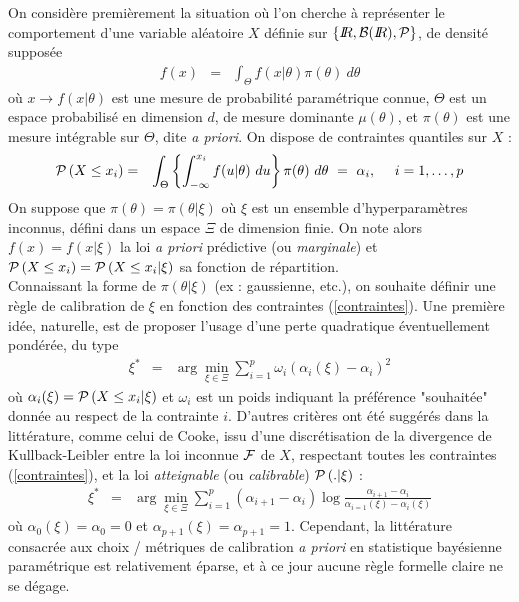 \documentclass[10pt]{article}
\newcommand{\R}{I\!\!R}
\newcommand{\1}{\mathbbm{1}}
\begin{document}
On consid\`ere premi\`erement la situation o\`u l'on cherche \`a repr\'esenter le comportement d'une variable al\'eatoire $X$ d\'efinie sur $\{\R,{\cal{B}}(\R),\cal{P}\}$, de densit\'e suppos\'ee
\begin{eqnarray}
f(x) & = & \int_{\Theta} f(x|\theta) \pi(\theta) \ d\theta
\end{eqnarray}
o\`u $x\to f(x|\theta)$ est une mesure de probabilit\'e param\'etrique connue, $\Theta$ est un espace probabilis\'e en dimension $d$, de mesure dominante $\mu(\theta)$, et $\pi(\theta)$ est une mesure int\'egrable sur $\Theta$, dite {\it a priori}. On dispose de contraintes quantiles sur $X$ : 
\begin{eqnarray}
{\cal{P}}\left(X\leq x_i \right) & = & \int_{\Theta} \left\{\int_{-\infty}^{x_i} f(u|\theta) \ du \right\} \pi(\theta) \ d\theta \ = \ \alpha_i, \ \ \ \ i=1,\ldots,p \label{contraintes}
\end{eqnarray}
On suppose que $\pi(\theta)=\pi(\theta|\xi)$ o\`u $\xi$ est un ensemble d'hyperparam\`etres inconnus, d\'efini dans un espace $\Xi$ de dimension finie. On note alors $f(x)=f(x|\xi)$ la loi {\it a priori} pr\'edictive (ou {\it marginale}) et ${\cal{P}}\left(X\leq x_i \right)={\cal{P}}\left(X\leq x_i|\xi \right)$ sa fonction de r\'epartition. \\

Connaissant la forme de $\pi(\theta|\xi)$ (ex : gaussienne, etc.), on souhaite d\'efinir une r\`egle de calibration de $\xi$ en fonction des contraintes (\ref{contraintes}). Une premi\`ere id\'ee, naturelle, est de proposer l'usage d'une perte quadratique \'eventuellement pond\'er\'ee, du type
\begin{eqnarray}
\xi^* & = & \arg\min\limits_{\xi\in\Xi} \sum\limits_{i=1}^p  \omega_i\left( \alpha_{i}(\xi) - \alpha_i\right)^2
\end{eqnarray}
o\`u $\alpha_{i}(\xi)={\cal{P}}\left(X\leq x_i|\xi \right)$ et $\omega_i$ est un poids indiquant la pr\'ef\'erence "souhait\'ee" donn\'ee au respect de la contrainte $i$. D'autres crit\`eres ont \'et\'e sugg\'er\'es dans la litt\'erature, comme celui de Cooke, issu d'une discr\'etisation de la divergence de Kullback-Leibler entre la loi inconnue ${\cal{F}}$ de $X$,  respectant toutes les contraintes (\ref{contraintes}), et la loi {\it atteignable} (ou {\it calibrable}) ${\cal{P}}\left(.|\xi \right)$ :
\begin{eqnarray*}
\xi^* & = & \arg\min\limits_{\xi\in\Xi} \sum\limits_{i=1}^p (\alpha_{i+1}-\alpha_i)\log\frac{\alpha_{i+1}-\alpha_i}{\alpha_{i=1}(\xi)-\alpha_{i}(\xi)}
\end{eqnarray*}
o\`u $\alpha_{0}(\xi)=\alpha_{0}=0$ et $\alpha_{p+1}(\xi)=\alpha_{p+1}=1$. Cependant, la litt\'erature consacr\'ee aux choix / m\'etriques de calibration {\it a priori} en statistique bay\'esienne param\'etrique est relativement \'eparse, et \`a ce jour aucune r\`egle formelle claire ne se d\'egage. \\
\end{document}
